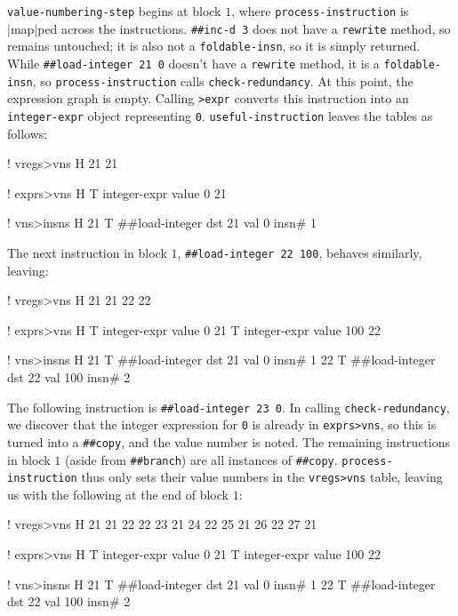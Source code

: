 \Verb|value-numbering-step| begins at block $1$, where
\Verb|process-instruction| is \factor|map|ped across the instructions.
%
\Verb|##inc-d 3|
%
does not have a \Verb|rewrite| method, so remains untouched; it is also not a
\Verb|foldable-insn|, so it is simply returned.  While
%
\Verb|##load-integer 21 0|
%
doesn't have a \Verb|rewrite| method, it is a \Verb|foldable-insn|, so
\Verb|process-instruction| calls \Verb|check-redundancy|.  At this point,
the expression graph is empty.  Calling \Verb|>expr| converts this
instruction into an \Verb|integer-expr| object representing \Verb|0|.
\Verb|useful-instruction| leaves the tables as follows:
%
  \begin{factorcode}
    ! vregs>vns
    H{ { 21 21 } }

    ! exprs>vns
    H{ { T{ integer-expr { value 0 } } 21 } }

    ! vns>insns
    H{
        { 21 T{ ##load-integer { dst 21 } { val 0 } { insn# 1 } } }
    }
  \end{factorcode}
%
\noindent The next instruction in block $1$,
%
\Verb|##load-integer 22 100|,
%
behaves similarly, leaving:
%
  \begin{factorcode}
    ! vregs>vns
    H{ { 21 21 } { 22 22 } }

    ! exprs>vns
    H{
        { T{ integer-expr { value 0 } } 21 }
        { T{ integer-expr { value 100 } } 22 }
    }

    ! vns>insns
    H{
        { 21 T{ ##load-integer { dst 21 } { val 0 } { insn# 1 } } }
        {
            22
            T{ ##load-integer { dst 22 } { val 100 } { insn# 2 } }
        }
    }
  \end{factorcode}
%
\noindent The following instruction is
%
\Verb|##load-integer 23 0|.
%
In calling \Verb|check-redundancy|, we discover that the integer expression for
\Verb|0| is already in \Verb|exprs>vns|, so this is turned into a
\Verb|##copy|, and the value number is noted.  The remaining instructions in
block $1$ (aside from \Verb|##branch|) are all instances of \Verb|##copy|.
\Verb|process-instruction| thus only sets their value numbers in the
\Verb|vregs>vns| table, leaving us with the following at the end of block $1$:
%
  \begin{factorcode}
    ! vregs>vns
    H{
        { 21 21 }
        { 22 22 }
        { 23 21 }
        { 24 22 }
        { 25 21 }
        { 26 22 }
        { 27 21 }
    }

    ! exprs>vns
    H{
        { T{ integer-expr { value 0 } } 21 }
        { T{ integer-expr { value 100 } } 22 }
    }

    ! vns>insns
    H{
        { 21 T{ ##load-integer { dst 21 } { val 0 } { insn# 1 } } }
        {
            22
            T{ ##load-integer { dst 22 } { val 100 } { insn# 2 } }
        }
    }
  \end{factorcode}

